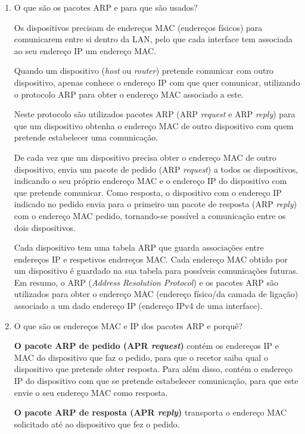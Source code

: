 \documentclass{article}
\begin{document}
\begin{enumerate}

\item O que são os pacotes ARP e para que são usados?

Os dispositivos precisam de endereços MAC (endereços físicos) para comunicarem entre si dentro da LAN, pelo que cada interface tem associada ao seu endereço IP um endereço MAC.

Quando um dispositivo (\textit{host} ou \textit{router}) pretende comunicar com outro dispositivo, apenas conhece o endereço IP com que quer comunicar, utilizando o protocolo ARP para obter o endereço MAC associado a este.

Neste protocolo são utilizados pacotes ARP (ARP \textit{request} e ARP \textit{reply}) para que um dispositivo obtenha o endereço MAC de outro dispositivo com quem pretende estabelecer uma comunicação. 

De cada vez que um dispositivo precisa obter o endereço MAC de outro dispositivo, envia um pacote de pedido (ARP \textit{request}) a todos os dispositivos, indicando o seu próprio endereço MAC e o endereço IP do dispositivo com que pretende comunicar. Como resposta, o dispositivo com o endereço IP indicado no pedido envia para o primeiro um pacote de resposta (ARP \textit{reply}) com o endereço MAC pedido, tornando-se possível a comunicação entre os dois dispositivos.

Cada dispositivo tem uma tabela ARP que guarda associações entre endereços IP e respetivos endereços MAC. Cada endereço MAC obtido por um dispositivo é guardado na sua tabela para possíveis comunicações futuras.
Em resumo, o ARP (\textit{Address Resolution Protocol}) e os pacotes ARP são utilizados para obter o endereço MAC (endereço físico/da camada de ligação) associado a um dado endereço IP (endereço IPv4 de uma interface). 


\item O que são os endereços MAC e IP dos pacotes ARP e porquê?

\textbf{O pacote ARP de pedido (APR \textit{request})} contém os endereços IP e MAC do dispositivo que faz o pedido, para que o recetor saiba qual o dispositivo que pretende obter resposta. Para além disso, contém o endereço IP do dispositivo com que se pretende estabelecer comunicação, para que este envie o seu endereço MAC como resposta. 

\textbf{O pacote ARP de resposta (APR \textit{reply})} transporta o endereço MAC solicitado até ao dispositivo que fez o pedido. 


\end{enumerate}
\end{document}
